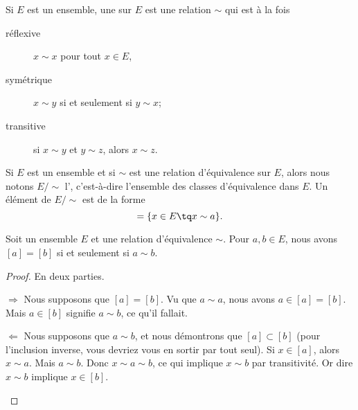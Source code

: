 \begin{definition}  \label{DefHoJzMp}
Si $E$ est un ensemble, une  sur $E$ est une relation $\sim$ qui est à la fois
\begin{description}
	\item[réflexive] $x\sim x$ pour tout $x\in E$,
	\item[symétrique] $x\sim y$ si et seulement si $y\sim x$;
	\item[transitive] si $x\sim y$ et $y\sim z$, alors $x\sim z$.
\end{description}
\end{definition}

\begin{definition}      \label{DEFooRHPSooHKBZXl}
    Si \( E\) est un ensemble et si \( \sim\) est une relation d'équivalence sur \( E\), alors nous notons \( E/\sim\) l', c'est-à-dire l'ensemble des classes d'équivalence dans \( E\). Un élément de \( E/\sim\) est de la forme
    \begin{equation}
        [a]=\{ x\in E\tq x\sim a \}.
    \end{equation}
\end{definition}

\begin{lemma}
    Soit un ensemble \( E\) et une relation d'équivalence \( \sim\). Pour \( a,b\in E\), nous avons \( [a]=[b]\) si et seulement si \( a\sim b\).
\end{lemma}

\begin{proof}
    En deux parties.
    \begin{subproof}
        \item[\( \Rightarrow\)]
            Nous supposons que \( [a]=[b]\). Vu que \( a\sim a\), nous avons \( a\in [a]=[b]\). Mais \( a\in [b]\) signifie \( a\sim b\), ce qu'il fallait.
        \item[\( \Leftarrow\)]
            Nous supposons que \( a\sim b\), et nous démontrons que \( [a]\subset [b]\) (pour l'inclusion inverse, vous devriez vous en sortir par tout seul). Si \( x\in [a]\), alors \( x\sim a\). Mais \( a\sim b\). Donc \( x\sim a\sim b\), ce qui implique \( x\sim b\) par transitivité. Or dire \( x\sim b\) implique \( x\in [b]\).
    \end{subproof}
\end{proof}

